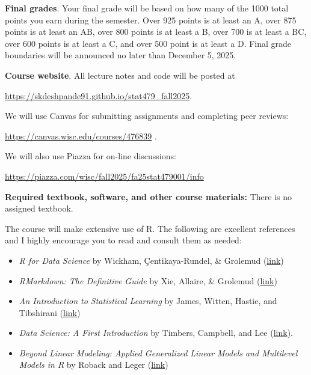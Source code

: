 \documentclass[11pt]{article}
\begin{document}
\textbf{Final grades}. Your final grade will be based on how many of the 1000 total points you earn during the semester.
Over 925 points is at least an A, over 875 points is at least an AB, over 800 points is at least a B, over 700 is at least a BC, over 600 points is at least a C, and over 500 point is at least a D.
Final grade boundaries will be announced no later than December 5, 2025.

\textbf{Course website}. All lecture notes and code will be posted at
\begin{center} \url{https://skdeshpande91.github.io/stat479\_fall2025}. \end{center}
We will use Canvas for submitting assignments and completing peer reviews:
\begin{center} \url{https://canvas.wisc.edu/courses/476839} .\end{center}

We will also use Piazza for on-line discussions:
\begin{center} \url{https://piazza.com/wisc/fall2025/fa25stat479001/info} \end{center}


\textbf{Required textbook, software, and other course materials:} 
There is no assigned textbook. 

The course will make extensive use of \textsf{R}.
The following are excellent references and I highly encourage you to read and consult them as needed:
\begin{itemize}
\item{\textit{R for Data Science} by Wickham, \c{C}entikaya-Rundel, \& Grolemud (\href{https://r4ds.hadley.nz}{link})}
\item{\textit{RMarkdown: The Definitive Guide} by Xie, Allaire, \& Grolemud (\href{https://bookdown.org/yihui/rmarkdown/}{link})}
\item{\textit{An Introduction to Statistical Learning} by James, Witten, Hastie, and Tibshirani (\href{https://www.statlearning.com}{link})}
\item{\textit{Data Science: A First Introduction} by Timbers, Campbell, and Lee (\href{https://datasciencebook.ca}{link}).}
\item{\textit{Beyond Linear Modeling: Applied Generalized Linear Models and Multilevel Models in R} by Roback and Leger (\href{https://bookdown.org/roback/bookdown-BeyondMLR/}{link})}
\end{itemize}
\end{document}
